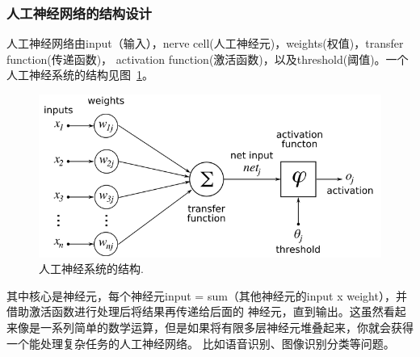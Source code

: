 \documentclass[12pt,a4paper,UTF8]{ctexart}
\begin{document}
\subsubsection{人工神经网络的结构设计}
人工神经网络由input（输入），nerve cell(人工神经元)，weights(权值)，transfer function(传递函数)，
activation function(激活函数)，以及threshold(阈值)。一个人工神经系统的结构见图~\ref{fig:人工神经系统的结构}。
\begin{figure}[htbp]
    \centering
    \includegraphics[width=12cm]{allpicture/v2-8b848443200436ac60334082e1f1e472_r.png}
    \caption{人工神经系统的结构.}
    \label{fig:人工神经系统的结构}
\end{figure}
其中核心是神经元，每个神经元input = sum（其他神经元的input x weight），并借助激活函数进行处理后将结果再传递给后面的
神经元，直到输出。这虽然看起来像是一系列简单的数学运算，但是如果将有限多层神经元堆叠起来，你就会获得一个能处理复杂任务的人工神经网络。
比如语音识别、图像识别分类等问题。
\end{document}
